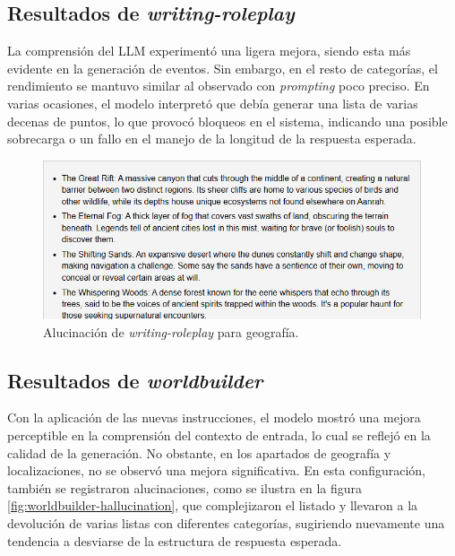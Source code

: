 \subsection{Resultados de \textit{writing-roleplay}}
La comprensión del LLM experimentó una ligera mejora,
siendo esta más evidente en la generación de eventos.
Sin embargo, en el resto de categorías, el rendimiento se mantuvo similar al observado con \textit{prompting} poco preciso.
En varias ocasiones, el modelo interpretó que debía generar una lista de varias decenas de puntos,
lo que provocó bloqueos en el sistema, indicando una posible sobrecarga o un fallo en el manejo de la longitud de la respuesta esperada.

\begin{figure}[htbp]
	\centering
	\includegraphics[width=1\textwidth]{./Figures/writing-prompt-geography.png}
	\caption{Alucinación de \textit{writing-roleplay} para geografía.}
	\label{fig:writing-geography}
\end{figure}

\subsection{Resultados de \textit{worldbuilder}}
Con la aplicación de las nuevas instrucciones, el modelo mostró
una mejora perceptible en la comprensión del contexto de entrada,
lo cual se reflejó en la calidad de la generación.
No obstante, en los apartados de geografía y localizaciones, no se observó una mejora significativa.
En esta configuración, también se registraron alucinaciones, como se ilustra en la figura \ref{fig:worldbuilder-hallucination},
que complejizaron el listado y llevaron a la devolución de varias listas con diferentes categorías,
sugiriendo nuevamente una tendencia a desviarse de la estructura de respuesta esperada.

